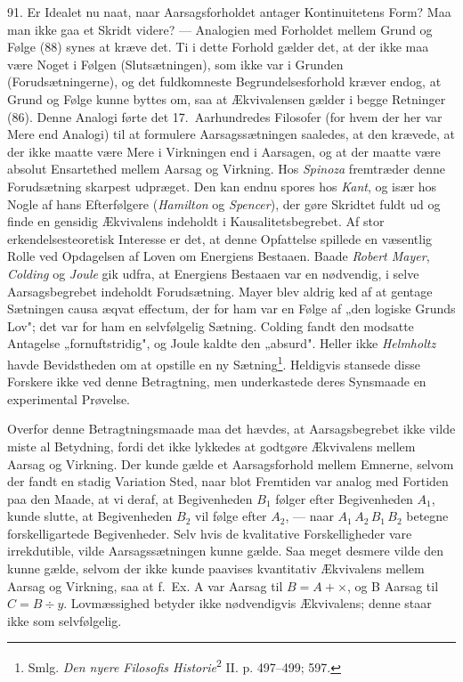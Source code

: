 \documentclass[12pt,a4paper]{book}
\newcommand{\opage}[1]{\marginnote{\footnotesize\textit{[#1]}}}
\begin{document}
91. Er Idealet nu naat, naar Aarsagsforholdet antager Kontinuitetens Form? Maa man
ikke gaa et Skridt videre? --- Analogien med Forholdet mellem Grund og Følge (88)
synes at kræve det. Ti i dette Forhold gælder det, at der ikke maa være Noget i
Følgen (Slutsætningen), som ikke var i Grunden (Forudsætningerne), og det
fuldkomneste Begrundelsesforhold kræver endog, at Grund og Følge kunne byttes om, saa at Ækvivalensen gælder i begge Retninger (86). Denne Analogi førte det 17.\
Aarhundredes Filosofer (for hvem der her var Mere end Analogi) til at formulere
Aarsagssætningen saaledes, at den krævede, at der ikke maatte være Mere i
Virkningen end i Aarsagen, og at der maatte være absolut Ensartethed mellem Aarsag og
Virkning. Hos \emph{Spinoza} fremtræder denne Forudsætning skarpest udpræget. Den
kan endnu spores hos \emph{Kant}, og især hos Nogle af hans Efterfølgere
(\emph{Hamilton} og \emph{Spencer}), der gøre Skridtet fuldt ud og finde en
gensidig Ækvivalens indeholdt i Kausalitetsbegrebet. Af stor erkendelsesteoretisk
Interesse er det, at denne Opfattelse spillede en væsentlig Rolle ved Opdagelsen
af Loven om Energiens Bestaaen. Baade \emph{Robert Mayer}, \emph{Colding} og
\emph{Joule} gik udfra, at Energiens Bestaaen var en nødvendig, i selve
Aarsagsbegrebet indeholdt Forudsætning. Mayer blev aldrig ked af at gentage
Sætningen causa æqvat effectum, der for ham var en Følge af „den logiske Grunds
Lov"; det var for ham en selvfølgelig Sætning. Colding fandt den modsatte Antagelse
„fornuftstridig", og Joule kaldte den „absurd". Heller ikke \emph{Helmholtz} \opage{214} havde
Bevidstheden om at opstille en ny Sætning\footnote{Smlg. \emph{Den nyere Filosofis
Historie}\textsuperscript{2} II. p. 497--499; 597.}. Heldigvis stansede disse
Forskere ikke ved denne Betragtning, men underkastede deres Synsmaade en
experimental Prøvelse.

Overfor denne Betragtningsmaade maa det hævdes, at Aarsagsbegrebet ikke vilde
miste al Betydning, fordi det ikke lykkedes at godtgøre Ækvivalens mellem Aarsag
og Virkning. Der kunde gælde et Aarsagsforhold mellem Emnerne, selvom der fandt en
stadig Variation Sted, naar blot Fremtiden var analog med Fortiden paa den Maade,
at vi deraf, at Begivenheden $B_1$ følger efter Begivenheden $A_1$, kunde slutte,
at Begivenheden $B_2$ vil følge efter $A_2$, --- naar $A_1\,A_2\,B_1\,B_2$ betegne
forskelligartede Begivenheder. Selv hvis de kvalitative Forskelligheder vare irrekdutible, vilde Aarsagssætningen kunne gælde. Saa meget desmere vilde den kunne
gælde, selvom der ikke kunde paavises kvantitativ Ækvivalens mellem Aarsag og
Virkning, saa at f.\ Ex. A var Aarsag til $B = A + \times$, og B Aarsag til
$C = B \div y$. Lovmæssighed betyder ikke nødvendigvis Ækvivalens; denne staar
ikke som selvfølgelig.
\end{document}
